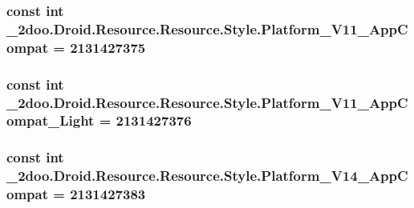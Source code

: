 \hypertarget{class__2doo_1_1_droid_1_1_resource_1_1_style_175dd82615942df31933b57238edc5e5}{
\subsubsection[{Platform\_\-V11\_\-AppCompat}]{\setlength{\rightskip}{0pt plus 5cm}const int \_\-2doo.Droid.Resource.Resource.Style.Platform\_\-V11\_\-AppCompat = 2131427375}}
\label{class__2doo_1_1_droid_1_1_resource_1_1_style_175dd82615942df31933b57238edc5e5}


\hypertarget{class__2doo_1_1_droid_1_1_resource_1_1_style_2f55b462f1f5d3eaefc5a0e283cf54e5}{
\subsubsection[{Platform\_\-V11\_\-AppCompat\_\-Light}]{\setlength{\rightskip}{0pt plus 5cm}const int \_\-2doo.Droid.Resource.Resource.Style.Platform\_\-V11\_\-AppCompat\_\-Light = 2131427376}}
\label{class__2doo_1_1_droid_1_1_resource_1_1_style_2f55b462f1f5d3eaefc5a0e283cf54e5}


\hypertarget{class__2doo_1_1_droid_1_1_resource_1_1_style_7426cf85605edeb6052e8782dc0b6e4e}{
\subsubsection[{Platform\_\-V14\_\-AppCompat}]{\setlength{\rightskip}{0pt plus 5cm}const int \_\-2doo.Droid.Resource.Resource.Style.Platform\_\-V14\_\-AppCompat = 2131427383}}
\label{class__2doo_1_1_droid_1_1_resource_1_1_style_7426cf85605edeb6052e8782dc0b6e4e}


